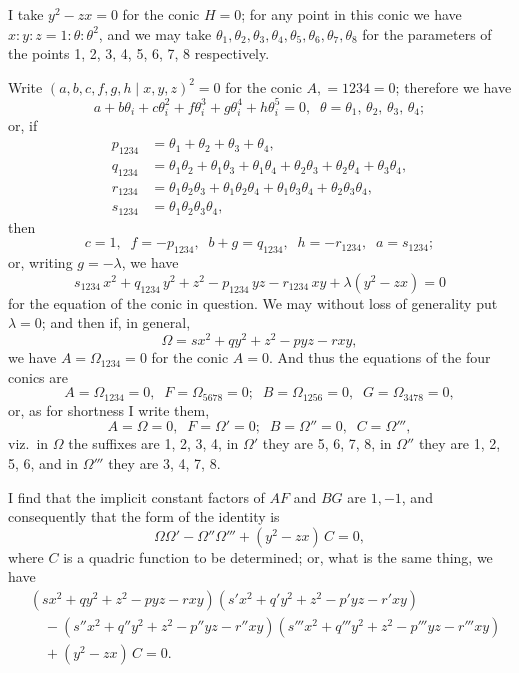 \documentclass[11pt]{article}
\begin{document}
I take $y^2-zx=0$ for the conic $H=0$; for any point in this conic we have $x:y:z = 1:\theta:\theta^2$, and we may take $\theta_1,\theta_2,\theta_3,\theta_4,\theta_5,\theta_6,\theta_7,\theta_8$ for the parameters of the points 1, 2, 3, 4, 5, 6, 7, 8 respectively.

Write $(a,b,c,f,g,h \mid x,y,z)^2=0$ for the conic $A,=1234=0$; therefore we have
\[ a + b\theta_i + c\theta_i^2 + f\theta_i^3 + g\theta_i^4 + h\theta_i^5 = 0,\;\; \theta=\theta_1,\,\theta_2,\,\theta_3,\,\theta_4; \]
or, if
\begin{align*}
p_{1234} &= \theta_1 + \theta_2 + \theta_3 + \theta_4,\\
q_{1234} &= \theta_1\theta_2 + \theta_1\theta_3 + \theta_1\theta_4 + \theta_2\theta_3 + \theta_2\theta_4 + \theta_3\theta_4,\\
r_{1234} &= \theta_1\theta_2\theta_3 + \theta_1\theta_2\theta_4 + \theta_1\theta_3\theta_4 + \theta_2\theta_3\theta_4,\\
s_{1234} &= \theta_1\theta_2\theta_3\theta_4,
\end{align*}
then
\[ c=1,\;\; f=-p_{1234},\;\; b+g=q_{1234},\;\; h=-r_{1234},\;\; a=s_{1234}; \]
or, writing $g=-\lambda$, we have
\[ s_{1234}\,x^2 + q_{1234}\,y^2 + z^2 - p_{1234}\,yz - r_{1234}\,xy + \lambda(y^2 - zx) = 0 \]
for the equation of the conic in question. We may without loss of generality put $\lambda=0$; and then if, in general,
\[ \Omega = sx^2 + qy^2 + z^2 - pyz - rxy, \]
we have $A=\Omega_{1234}=0$ for the conic $A=0$. And thus the equations of the four conics are
\[ A=\Omega_{1234}=0,\;\; F=\Omega_{5678}=0;\;\; B=\Omega_{1256}=0,\;\; G=\Omega_{3478}=0, \]
or, as for shortness I write them,
\[ A=\Omega=0,\;\; F=\Omega'=0;\;\; B=\Omega''=0,\;\; C=\Omega''', \]
viz.\ in $\Omega$ the suffixes are 1, 2, 3, 4, in $\Omega'$ they are 5, 6, 7, 8, in $\Omega''$ they are 1, 2, 5, 6, and in $\Omega'''$ they are 3, 4, 7, 8.

I find that the implicit constant factors of $AF$ and $BG$ are $1,-1$, and consequently that the form of the identity is
\[ \Omega\Omega' - \Omega''\Omega''' + (y^2 - zx)\,C = 0, \]
where $C$ is a quadric function to be determined; or, what is the same thing, we have
\begin{align*}
& (sx^2 + qy^2 + z^2 - pyz - rxy)(s'x^2 + q'y^2 + z^2 - p'yz - r'xy)\\
& \quad - (s''x^2 + q''y^2 + z^2 - p''yz - r''xy)(s'''x^2 + q'''y^2 + z^2 - p'''yz - r'''xy)\\
& \quad + (y^2 - zx)\,C = 0.
\end{align*}
\end{document}
